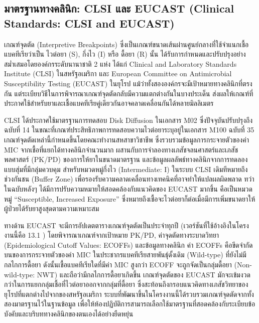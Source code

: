 \subsection{มาตรฐานทางคลินิก: CLSI และ EUCAST (Clinical Standards: CLSI and EUCAST)}

เกณฑ์จุดตัด (Interpretive Breakpoints) ซึ่งเป็นเกณฑ์ขนาดเส้นผ่านศูนย์กลางที่ใช้จำแนกเชื้อแบคทีเรียว่าเป็น ไวต่อยา (S), กึ่งไว (I) หรือ ดื้อยา (R) นั้น ได้รับการกำหนดและปรับปรุงอย่างสม่ำเสมอโดยองค์กรระดับนานาชาติ 2 แห่ง ได้แก่ Clinical and Laboratory Standards Institute (CLSI) ในสหรัฐอเมริกา และ European Committee on Antimicrobial Susceptibility Testing (EUCAST) ในยุโรป \cite{eucast2023} แม้ว่าทั้งสององค์กรจะมีเป้าหมายทางคลินิกที่ตรงกัน แต่ระเบียบวิธีในการพิจารณาเกณฑ์จุดตัดกลับมีความแตกต่างกันในบางประเด็น ส่งผลให้เกณฑ์ที่ประกาศใช้สำหรับยาและเชื้อแบคทีเรียคู่เดียวกันอาจคลาดเคลื่อนกันได้หลายมิลลิเมตร

CLSI ได้ประกาศใช้มาตรฐานการทดสอบ Disk Diffusion ในเอกสาร M02 ซึ่งปัจจุบันปรับปรุงถึงฉบับที่ 14 \cite{clsi2025} ในขณะที่เกณฑ์ประสิทธิภาพการทดสอบความไวต่อยาระบุอยู่ในเอกสาร M100 ฉบับที่ 35 \cite{clsi_m100_2025} เกณฑ์จุดตัดเหล่านี้กำหนดขึ้นโดยคณะทำงานสหสาขาวิชาชีพ ซึ่งรวบรวมข้อมูลการกระจายตัวของค่า MIC จากเชื้อที่แยกได้ทางคลินิกจำนวนมาก ผสานกับการจำลองทางเภสัชจลนศาสตร์และเภสัชพลศาสตร์ (PK/PD) ของการให้ยาในขนาดมาตรฐาน และข้อมูลผลลัพธ์ทางคลินิกจากการทดลองแบบสุ่มที่มีกลุ่มควบคุม สำหรับหมวดหมู่กึ่งไว (Intermediate: I) ในระบบ CLSI เดิมทีหมายถึงช่วงกันชน (Buffer Zone) เพื่อรองรับความคลาดเคลื่อนทางเทคนิคที่อาจทำให้แปลผลผิดพลาด ทว่าในฉบับหลังๆ ได้มีการปรับความหมายให้สอดคล้องกับแนวคิดของ EUCAST มากขึ้น คือเป็นหมวดหมู่ ``Susceptible, Increased Exposure'' ซึ่งหมายถึงเชื้อจะไวต่อยาก็ต่อเมื่อมีการเพิ่มขนาดยาให้ผู้ป่วยได้รับยาสูงสุดตามความเหมาะสม

ทางด้าน EUCAST จะมีการอัปเดตตารางเกณฑ์จุดตัดเป็นประจำทุกปี (เวอร์ชันที่ใช้อ้างอิงในโครงงานนี้คือ 13.1 \cite{eucast2023}) โดยพิจารณาเกณฑ์จากเป้าหมาย PK/PD, ค่าจุดตัดทางระบาดวิทยา (Epidemiological Cutoff Values: ECOFFs) และข้อมูลทางคลินิก \cite{giske2022} ค่า ECOFFs คือขีดจำกัดบนของการกระจายตัวของค่า MIC ในประชากรแบคทีเรียสายพันธุ์ดั้งเดิม (Wild-type) ที่ยังไม่มีกลไกการดื้อยา ดังนั้นเชื้อแบคทีเรียใดที่มีค่า MIC สูงกว่า ECOFF จะถูกจัดเป็นกลุ่มดื้อยา (Non-wild-type: NWT) และถือว่ามีกลไกการดื้อยาเกิดขึ้น เกณฑ์จุดตัดของ EUCAST มักจะเข้มงวดกว่าในการแยกกลุ่มเชื้อที่ไวต่อยาออกจากกลุ่มที่ดื้อยา ซึ่งสะท้อนถึงกรอบแนวคิดทางเภสัชวิทยาของยุโรปที่แตกต่างไปจากของสหรัฐอเมริกา \cite{kahlmeter2019} ระบบที่พัฒนาขึ้นในโครงงานนี้ได้รวบรวมเกณฑ์จุดตัดจากทั้งสองมาตรฐานไว้ในฐานข้อมูล เพื่อให้ห้องปฏิบัติการสามารถเลือกใช้มาตรฐานที่สอดคล้องกับระเบียบข้อบังคับและบริบททางคลินิกของตนเองได้อย่างยืดหยุ่น

